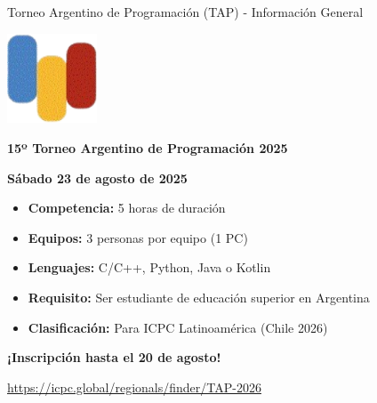 \documentclass{beamer}
\begin{document}
\begin{frame}{Torneo Argentino de Programación (TAP) - Información General}
\begin{center}
\includegraphics[width=0.2\textwidth,keepaspectratio]{img/tap_logo.png}

\vspace{0.1cm}

\Large
\textbf{15º Torneo Argentino de Programación 2025}

\normalsize
\textbf{Sábado 23 de agosto de 2025}

\vspace{0.1cm}

\begin{itemize}
\item \textbf{Competencia:} 5 horas de duración
\item \textbf{Equipos:} 3 personas por equipo (1 PC)
\item \textbf{Lenguajes:} C/C++, Python, Java o Kotlin
\item \textbf{Requisito:} Ser estudiante de educación superior en Argentina
\item \textbf{Clasificación:} Para ICPC Latinoamérica (Chile 2026)
\end{itemize}

\textbf{¡Inscripción hasta el 20 de agosto!}

\small
\url{https://icpc.global/regionals/finder/TAP-2026}
\end{center}
\end{frame}
\end{document}
